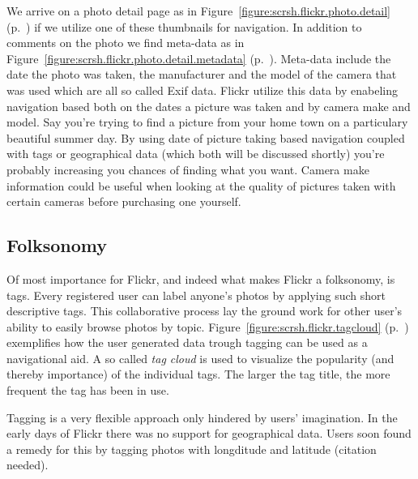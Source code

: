 We arrive on a photo detail page as in
Figure~\ref{figure:scrsh.flickr.photo.detail}
(p.~\pageref{figure:scrsh.flickr.photo.detail})
if we utilize one of these thumbnails for navigation. In addition to comments
on the photo we find meta-data as in 
Figure~\ref{figure:scrsh.flickr.photo.detail.metadata}
(p.~\pageref{figure:scrsh.flickr.photo.detail.metadata}).
Meta-data include the date the photo was taken, the manufacturer and the model
of the camera that was used which are all so called Exif%
data. Flickr utilize this data by enabeling navigation based both on the
dates a picture was taken and by camera make and model. Say you're trying to
find a picture from your home town on a particulary beautiful summer day. By
using date of picture taking based navigation coupled with tags or
geographical data (which both will be discussed shortly) you're probably
increasing you chances of finding what you want. Camera make information could
be useful when looking at the quality of pictures taken with certain cameras
before purchasing one yourself.

\subsection{Folksonomy}
Of most importance
for Flickr, and indeed what makes Flickr a folksonomy, is tags. Every
registered user can label anyone's photos by applying such short descriptive
tags. This collaborative process lay the ground work for other user's ability
to easily browse photos by topic.
Figure~\ref{figure:scrsh.flickr.tagcloud}
(p.~\pageref{figure:scrsh.flickr.tagcloud}) exemplifies how the user generated
data trough tagging can be used as a navigational aid. A so called \emph{tag
cloud} is used to visualize the popularity (and thereby importance) of the
individual tags. The larger the tag title, the more frequent the tag has been
in use.

Tagging is a very flexible approach only hindered by users' imagination. In the
early days of Flickr there was no support for geographical data. Users soon
found a remedy for this by tagging photos with longditude and latitude
(citation needed).

